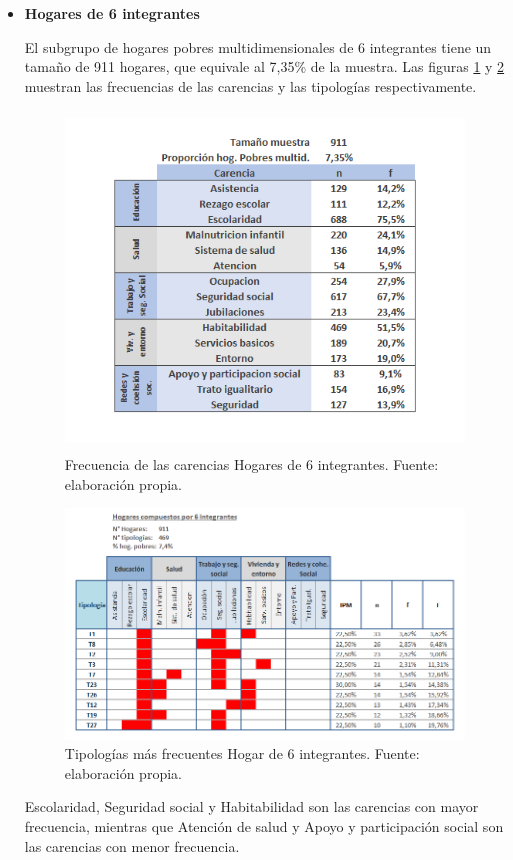 \documentclass[12pt,letterpaper,spanish]{article}
\begin{document}
\begin{itemize}
    \item \textbf{Hogares de 6 integrantes}
    
    El subgrupo de hogares pobres multidimensionales de 6 integrantes tiene un tamaño de 911 hogares, que equivale al 7,35\% de la muestra. Las figuras \ref{fren6} y \ref{tipn6} muestran las frecuencias de las carencias y las tipologías respectivamente.
    
    \begin{figure}[H]
        \centering
        \includegraphics[height=9cm]{HOGARES/tabla_num6.png}
        \caption{Frecuencia de las carencias Hogares de 6 integrantes. Fuente: elaboración propia.}
        \label{fren6}
    \end{figure}
    \begin{figure}[H]
        \centering
        \includegraphics[width=\textwidth]{Mati N/n=6.png}
        \caption{Tipologías más frecuentes Hogar de 6 integrantes. Fuente: elaboración propia.}
        \label{tipn6}
    \end{figure}
    Escolaridad, Seguridad social y Habitabilidad son las carencias con mayor frecuencia, mientras que Atención de salud y Apoyo y participación social son las carencias con menor frecuencia.
    

\end{itemize}
\end{document}
